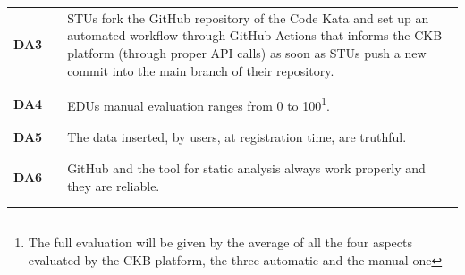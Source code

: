 \begin{table}[H]
\begin{tabular}{l l p{10.5cm}}
        \textbf{DA3} & \vline & STUs fork the GitHub repository of the Code Kata and set up an automated workflow through GitHub Actions that informs the CKB platform (through proper API calls) as soon as STUs push a new commit into the main branch of their repository. \\
                     &        &                                                                                                                                                                                                                                               \\\hline & & \\
        \textbf{DA4} & \vline & EDUs manual evaluation ranges from 0 to 100\footnote{The full evaluation will be given by the average of all the four aspects evaluated by the CKB platform, the three automatic and the manual one}.                                         \\
                     &        &                                                                                                                                                                                                                                               \\\hline & & \\
        \textbf{DA5} & \vline & The data inserted, by users, at registration  time, are truthful.                                                                                                                                                                             \\
                     &        &                                                                                                                                                                                                                                               \\\hline & & \\
        \textbf{DA6} & \vline & GitHub and the tool for static analysis always work properly and they are reliable.                                                                                                                                                           \\
                     &        &                                                                                                                                                                                                                                               \\\hline & & \\

\end{tabular}
\end{table}
